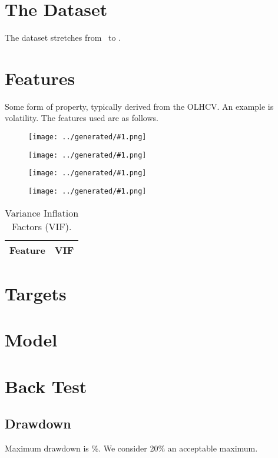 \documentclass[a4paper]{article}
\newcommand{\figureTau}[1]{
    \begin{figure}[H]
        \begin{center}
            \texttt{[image: ../generated/\#1.png]}
        \end{center}
    \end{figure}
}
\begin{document}
\section{The Dataset}

The dataset stretches from \constantStartdate \  to \constantEnddate.

\section{Features}

Some form of property, typically derived from the OLHCV. An example is
volatility. The features used are as follows.

\figureTau{feature_BollingerBands}

\figureTau{feature_RSI}

\figureTau{pearsonmatrix}

\figureTau{spearmanmatrix}

\begin{table}[H]
\begin{center}
\caption{Variance Inflation Factors (VIF).}
    \begin{tabular}{ |l|p{1in}| }
        \hline
        Feature & VIF \\
        \hline

        
    \end{tabular}
\end{center}
\end{table}

\section{Targets}

\section{Model}



\section{Back Test}
\subsection{Drawdown}

Maximum drawdown is \constantMaxdrawdown \%. We consider 20\% an acceptable maximum.
\end{document}
